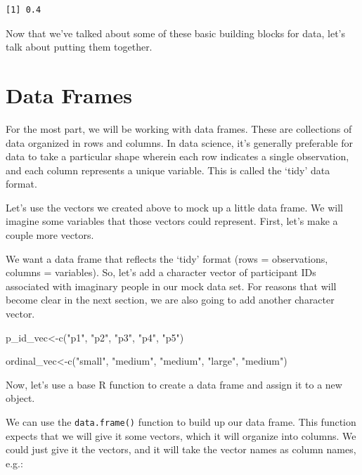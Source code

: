 \documentclass[
  letterpaper,
  DIV=11,
  numbers=noendperiod]{scrreprt}
\newenvironment{Shaded}{\begin{snugshade}}{\end{snugshade}}
\newcommand{\FunctionTok}[1]{\textcolor[rgb]{0.28,0.35,0.67}{#1}}
\newcommand{\NormalTok}[1]{\textcolor[rgb]{0.00,0.23,0.31}{#1}}
\newcommand{\OtherTok}[1]{\textcolor[rgb]{0.00,0.23,0.31}{#1}}
\newcommand{\StringTok}[1]{\textcolor[rgb]{0.13,0.47,0.30}{#1}}
\begin{document}
\begin{verbatim}
[1] 0.4
\end{verbatim}

Now that we've talked about some of these basic building blocks for
data, let's talk about putting them together.

\section{Data Frames}\label{data-frames}

For the most part, we will be working with data frames. These are
collections of data organized in rows and columns. In data science, it's
generally preferable for data to take a particular shape wherein each
row indicates a single observation, and each column represents a unique
variable. This is called the `tidy' data format.

Let's use the vectors we created above to mock up a little data frame.
We will imagine some variables that those vectors could represent.
First, let's make a couple more vectors.

We want a data frame that reflects the `tidy' format (rows =
observations, columns = variables). So, let's add a character vector of
participant IDs associated with imaginary people in our mock data set.
For reasons that will become clear in the next section, we are also
going to add another character vector.

\begin{Shaded}
\begin{Highlighting}[]
\NormalTok{p\_id\_vec}\OtherTok{\textless{}{-}}\FunctionTok{c}\NormalTok{(}\StringTok{"p1"}\NormalTok{, }\StringTok{"p2"}\NormalTok{, }\StringTok{"p3"}\NormalTok{, }\StringTok{"p4"}\NormalTok{, }\StringTok{"p5"}\NormalTok{)}

\NormalTok{ordinal\_vec}\OtherTok{\textless{}{-}}\FunctionTok{c}\NormalTok{(}\StringTok{"small"}\NormalTok{, }\StringTok{"medium"}\NormalTok{, }\StringTok{"medium"}\NormalTok{, }\StringTok{"large"}\NormalTok{, }\StringTok{"medium"}\NormalTok{)}
\end{Highlighting}
\end{Shaded}

Now, let's use a base R function to create a data frame and assign it to
a new object.

We can use the \texttt{data.frame()} function to build up our data
frame. This function expects that we will give it some vectors, which it
will organize into columns. We could just give it the vectors, and it
will take the vector names as column names, e.g.:
\end{document}
